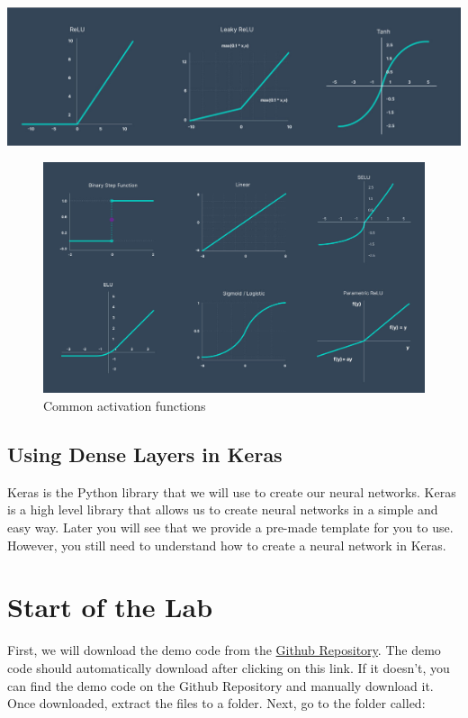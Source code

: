 \documentclass[11pt]{report}
\begin{document}
\includegraphics[width=1\textwidth]{activation functions 1.jpg}
\begin{figure}
    \begin{center}
    \includegraphics[width=1\textwidth]{activation functions 2.jpg}
    \caption{Common activation functions}
    \label{fig:activation_functions}
    \end{center}
\end{figure}

\pagebreak

\section{Using Dense Layers in Keras}
Keras is the Python library that we will use to create our neural networks. Keras is a high level library that allows us to create neural networks in a simple and easy way. Later you will see that we provide a pre-made template for you to use. However, you still need to understand how to create a neural network in Keras.


\chapter{Start of the Lab}
First, we will download the demo code from the \href{https://github.com/PiCarV/Demos/archive/refs/heads/main.zip}{Github Repository}. The demo code should automatically download after clicking on this link. If it doesn't, you can find the demo code on the Github Repository and manually download it. Once downloaded, extract the files to a folder. Next, go to the folder called:
\end{document}
